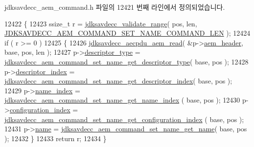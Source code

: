 jdksavdecc\+\_\+aem\+\_\+command.\+h 파일의 12421 번째 라인에서 정의되었습니다.


\begin{DoxyCode}
12422 \{
12423     ssize\_t r = \hyperlink{group__util_ga9c02bdfe76c69163647c3196db7a73a1}{jdksavdecc\_validate\_range}( pos, len, 
      \hyperlink{group__command__set__name_ga133a28cbd2bc0e77c69d8135f36324f6}{JDKSAVDECC\_AEM\_COMMAND\_SET\_NAME\_COMMAND\_LEN} );
12424     \textcolor{keywordflow}{if} ( r >= 0 )
12425     \{
12426         \hyperlink{group__aecpdu__aem_gae2421015dcdce745b4f03832e12b4fb6}{jdksavdecc\_aecpdu\_aem\_read}( &p->\hyperlink{structjdksavdecc__aem__command__set__name_ae1e77ccb75ff5021ad923221eab38294}{aem\_header}, base, pos, len );
12427         p->\hyperlink{structjdksavdecc__aem__command__set__name_ab7c32b6c7131c13d4ea3b7ee2f09b78d}{descriptor\_type} = 
      \hyperlink{group__command__set__name_ga497a7e4d98b47ceca126a974323f71e9}{jdksavdecc\_aem\_command\_set\_name\_get\_descriptor\_type}( 
      base, pos );
12428         p->\hyperlink{structjdksavdecc__aem__command__set__name_a042bbc76d835b82d27c1932431ee38d4}{descriptor\_index} = 
      \hyperlink{group__command__set__name_gaf3f01f5644f0d3adc2dc5d992c000d59}{jdksavdecc\_aem\_command\_set\_name\_get\_descriptor\_index}( 
      base, pos );
12429         p->\hyperlink{structjdksavdecc__aem__command__set__name_a898a74ada625e0b227dadb02901404e6}{name\_index} = \hyperlink{group__command__set__name_gaff73dfa5ea5a6a960dd05630e378f59f}{jdksavdecc\_aem\_command\_set\_name\_get\_name\_index}
      ( base, pos );
12430         p->\hyperlink{structjdksavdecc__aem__command__set__name_afaad1bd7c66f9611e134d8c5ce98f444}{configuration\_index} = 
      \hyperlink{group__command__set__name_gaca021112f6fa80ed6ee671090c0420a2}{jdksavdecc\_aem\_command\_set\_name\_get\_configuration\_index}
      ( base, pos );
12431         p->\hyperlink{structjdksavdecc__aem__command__set__name_a7e615b51b7768e9b59bfa450051e0f8e}{name} = \hyperlink{group__command__set__name_ga61bde5eefbc433ef4bea0bae27bfd71e}{jdksavdecc\_aem\_command\_set\_name\_get\_name}( 
      base, pos );
12432     \}
12433     \textcolor{keywordflow}{return} r;
12434 \}
\end{DoxyCode}


